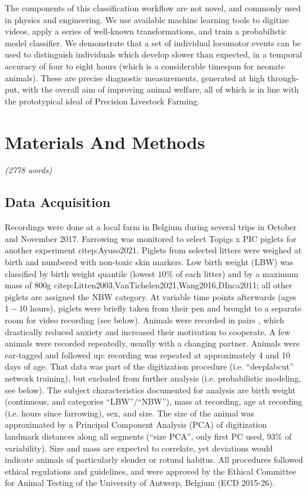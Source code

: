 \documentclass[10pt,a4paper]{article}
\begin{document}
The components of this classification workflow are not novel, and commonly used in physics and engineering.
We use available machine learning tools to digitize videos, apply a series of well-known transformations, and train a probabilistic model classifier.
We demonstrate that a set of individual locomotor events can be used to distinguish individuals which develop slower than expected, in a temporal accuracy of four to eight hours (which is a considerable timespan for neonate animals).
These are precise diagnostic measurements, generated at high through-put, with the overall aim of improving animal welfare, all of which is in line with the prototypical ideal of Precision Livestock Farming.


\FloatBarrier
\clearpage
\section{Materials And Methods}
\label{methods}
\emph{(2778 words)\\\empty
}

\subsection{Data Acquisition}
\label{sec:orgd0bae22}

Recordings were done at a local farm in Belgium during several trips in October and November 2017.
Farrowing was monitored to select Topigs x PIC piglets for another experiment citep:Ayuso2021.
Piglets from selected litters were weighed at birth and numbered with non-toxic skin markers.
Low birth weight (LBW) was classified by birth weight quantile (lowest \(10 \%\) of each litter) and by a maximum mass of \(800\)g citep:Litten2003,VanTichelen2021,Wang2016,DInca2011; all other piglets are assigned the NBW category.
At variable time points afterwards (ages \(1 - 10\) hours), piglets were briefly taken from their pen and brought to a separate room for video recording (see below).
Animals were recorded in pairs \citep[as in][]{Mielke2018}, which drastically reduced anxiety and increased their motivation to cooperate.
A few animals were recorded repeatedly, usually with a changing partner.
Animals were ear-tagged and followed up: recording was repeated at approximately 4 and 10 days of age.
That data was part of the digitization procedure (i.e. ``deeplabcut'' network training), but excluded from further analysis (i.e. probabilistic modeling, see below).
The subject characteristics documented for analysis are birth weight (continuous, and categories ``LBW''/``NBW''), mass at recording, age at recording (i.e. hours since farrowing), sex, and size.
The size of the animal was approximated by a Principal Component Analysis (PCA) of digitization landmark distances along all segments (``size PCA'', only first PC used,
\(93 \%\)
of variability).
Size and mass are expected to correlate, yet deviations would indicate animals of particularly slender or rotund habitus.
All procedures followed ethical regulations and guidelines, and were approved by the Ethical Committee for Animal Testing of the University of Antwerp, Belgium (ECD 2015-26).
\end{document}
